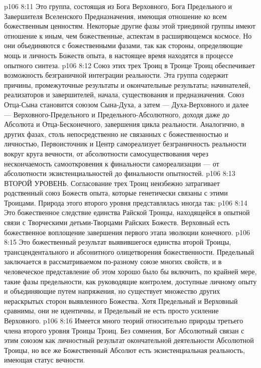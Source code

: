 \vs p106 8:11 \pc {}\bibnobreakspace {} Это группа, состоящая из Бога Верховного, Бога Предельного и Завершителя Вселенского Предназначения, имеющая отношение ко всем божественным ценностям. Некоторые другие фазы этой триединой группы имеют отношение к иным, чем божественные, аспектам в расширяющемся космосе. Но они объединяются с божественными фазами, так как стороны, определяющие мощь и личность Божеств опыта, в настоящее время находятся в процессе опытного синтеза.
\vs p106 8:12 \pc Союз этих трех Троиц в Троице Троиц обеспечивает возможность безграничной интеграции реальности. Эта группа содержит причины, промежуточные результаты и окончательные результаты; начинателей, реализаторов и завершителей, начала, существования и предназначения. Союз Отца\hyp{}Сына становится союзом Сына\hyp{}Духа, а затем --- Духа\hyp{}Верховного и далее --- Верховного\hyp{}Предельного и Предельного\hyp{}Абсолютного, доходя даже до Абсолюта и Отца\hyp{}Бесконечного, завершения цикла реальности. Аналогично, в других фазах, столь непосредственно не связанных с божественностью и личностью, Первоисточник и Центр самореализует безграничность реальности вокруг круга вечности, от абсолютности самосуществования через нескончаемость самооткровения к финальности самореализации --- от абсолютности экзистенциальностей до финальности опытностей.
\vs p106 8:13 \pc ВТОРОЙ УРОВЕНЬ. Согласование трех Троиц неизбежно затрагивает родственный союз Божеств опыта, которые генетически связаны с этими Троицами. Природа этого второго уровня представлялась иногда так:
\vs p106 8:14 \bibnobreakspace {} Это божественное следствие единства Райской Троицы, находящейся в опытной связи с Творческими детьми\hyp{}Творцами Райских Божеств. Верховный есть божественное воплощение завершения первого этапа эволюции конечного.
\vs p106 8:15 \pc {}\bibnobreakspace {} Это божественный результат выявившегося единства второй Троицы, трансцендентального и абсонитного олицетворения божественности. Предельный заключается в рассматриваемом по\hyp{}разному союзе многих свойств, и в человеческое представление об этом хорошо было бы включить, по крайней мере, такие фазы предельности, как руководящие контролем, доступные личному опыту и объединяющие путем напряжения, но существует множество других нераскрытых сторон выявленного Божества. Хотя Предельный и Верховный сравнимы, они не идентичны, и Предельный не есть просто усиление Верховного.
\vs p106 8:16 \pc {}\bibnobreakspace {} Имеется много теорий относительно природы третьего члена второго уровня Троицы Троиц. Без сомнения, Бог Абсолютный связан с этим союзом как личностный результат окончательной деятельности Абсолютной Троицы, но все же Божественный Абсолют есть экзистенциальная реальность, имеющая статус вечности.
